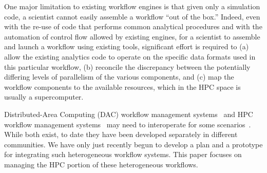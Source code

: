 One major limitation to existing workflow engines is that
given only a simulation code, a scientist cannot easily
assemble a workflow ``out of the box.''
Indeed, even with the re-use of code that performs
common analytical procedures and with the automation of control flow
allowed by existing engines,
for a scientist to assemble
and launch a workflow using existing tools,
significant effort is required to (a) allow the existing
analytics code
to operate on the specific data formats used in this
particular workflow,
(b) reconcile the discrepancy between the potentially
differing levels of parallelism
of the various components,
and (c) map the workflow components
to the available resources, which in the HPC space
is usually a supercomputer.



\fi

Distributed-Area Computing
(DAC) workflow management
systems~\cite{tejedor:2015:pycompss,deelman:2015:pegasus} and HPC workflow
management systems~\cite{dorier:2015:in-situ-lessons} may need to interoperate
for some scenarios~\cite{deelman:2015:workflows-report}. While both exist, to
date they have been developed separately in different communities. We have only
just recently begun to develop a plan and a prototype for integrating such
heterogeneous workflow systems. This paper focuses on managing the HPC portion of
these heterogeneous workflows.
\fi



